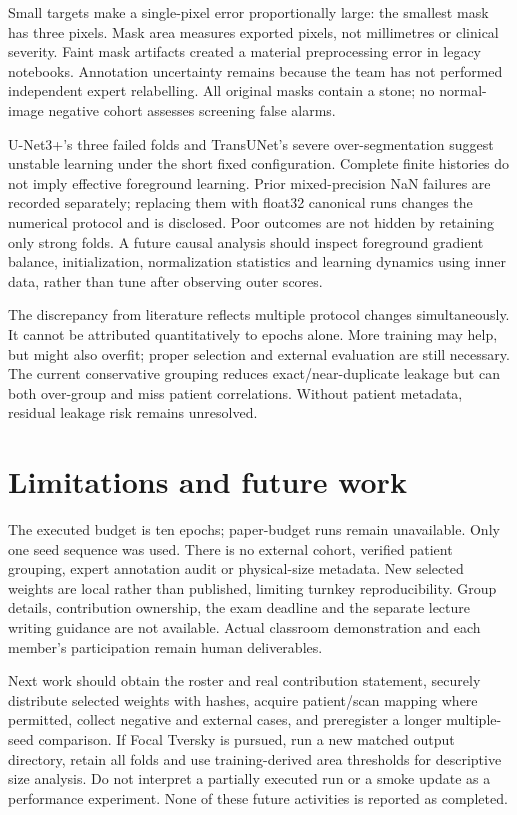 \documentclass[a4paper,fleqn]{cas-sc}
\begin{document}
Small targets make a single-pixel error proportionally large: the smallest mask has three pixels. Mask area measures exported pixels, not millimetres or clinical severity. Faint mask artifacts created a material preprocessing error in legacy notebooks. Annotation uncertainty remains because the team has not performed independent expert relabelling. All original masks contain a stone; no normal-image negative cohort assesses screening false alarms.

U-Net3+'s three failed folds and TransUNet's severe over-segmentation suggest unstable learning under the short fixed configuration. Complete finite histories do not imply effective foreground learning. Prior mixed-precision NaN failures are recorded separately; replacing them with float32 canonical runs changes the numerical protocol and is disclosed. Poor outcomes are not hidden by retaining only strong folds. A future causal analysis should inspect foreground gradient balance, initialization, normalization statistics and learning dynamics using inner data, rather than tune after observing outer scores.

The discrepancy from literature reflects multiple protocol changes simultaneously. It cannot be attributed quantitatively to epochs alone. More training may help, but might also overfit; proper selection and external evaluation are still necessary. The current conservative grouping reduces exact/near-duplicate leakage but can both over-group and miss patient correlations. Without patient metadata, residual leakage risk remains unresolved.

\section{Limitations and future work}
The executed budget is ten epochs; paper-budget runs remain unavailable. Only one seed sequence was used. There is no external cohort, verified patient grouping, expert annotation audit or physical-size metadata. New selected weights are local rather than published, limiting turnkey reproducibility. Group details, contribution ownership, the exam deadline and the separate lecture writing guidance are not available. Actual classroom demonstration and each member's participation remain human deliverables.

Next work should obtain the roster and real contribution statement, securely distribute selected weights with hashes, acquire patient/scan mapping where permitted, collect negative and external cases, and preregister a longer multiple-seed comparison. If Focal Tversky is pursued, run a new matched output directory, retain all folds and use training-derived area thresholds for descriptive size analysis. Do not interpret a partially executed run or a smoke update as a performance experiment. None of these future activities is reported as completed.
\end{document}
